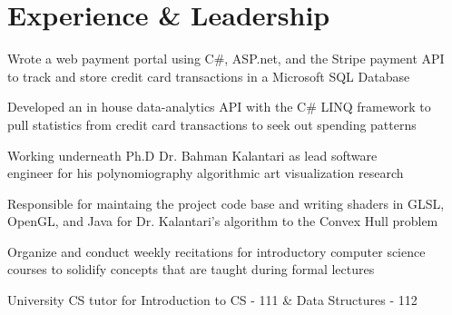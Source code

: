 \documentclass[]{deedy-resume-openfont}
\begin{document}
\hfill
\begin{minipage}[t]{0.66\textwidth} 


\section{Experience \& Leadership}

\vspace{\topsep} 
\begin{tightemize}
\item Wrote a web payment portal using C\#, ASP.net, and the Stripe payment API \\to track and store credit card transactions in a Microsoft SQL Database
\item Developed an in house data-analytics API with the C\# LINQ framework to \\pull statistics from credit card transactions to seek out spending patterns
\end{tightemize}
\sectionsep

\begin{tightemize}
\item Working underneath Ph.D Dr. Bahman Kalantari as lead software \\engineer for his polynomiography algorithmic art visualization research 
\item Responsible for maintaing the project code base and writing shaders in GLSL, OpenGL, and Java for Dr. Kalantari's algorithm to the Convex Hull problem
\end{tightemize}
\sectionsep

\begin{tightemize}
\item Organize and conduct weekly recitations for introductory computer science courses to solidify concepts that are taught during formal lectures
\item University CS tutor for Introduction to CS - 111 \& Data Structures - 112
\end{tightemize}
\sectionsep


\end{minipage}
\end{document}
